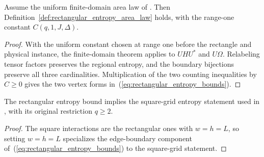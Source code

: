 \begin{lemma}
    \label{thm:rectangular_entropy_from_uniform}
    \leanok
    Assume the uniform finite-domain area law of
    \cite[Theorem~1.1]{OpenAI2026AreaLaw}. Then
    Definition~\ref{def:rectangular_entropy_area_law} holds, with the
    range-one constant $C(q,1,J,\Delta)$.
\end{lemma}
\begin{proof}
    \leanok
    With the uniform constant chosen at range one before the rectangle and
    physical instance, the finite-domain theorem applies to $UHU^*$ and
    $U\Omega$. Relabeling tensor factors preserves the regional entropy,
    and the boundary bijections preserve all three cardinalities.
    Multiplication of the two counting inequalities by $C\ge0$ gives
    the two vertex forms in~(\ref{eq:rectangular_entropy_bounds}).
\end{proof}

\begin{lemma}
    \label{thm:rectangular_equal_side_entropy}
    \leanok
    The rectangular entropy bound implies the square-grid entropy statement
    used in \cite[Proposition~2.1]{OpenAI2026PolynomialPEPS}, with its original
    restriction $q\ge2$.
\end{lemma}
\begin{proof}
    \leanok
    The square interactions are the rectangular ones with $w=h=L$, so setting $w=h=L$
    specializes
    the edge-boundary component of~(\ref{eq:rectangular_entropy_bounds}) to
    the square-grid statement.
\end{proof}

